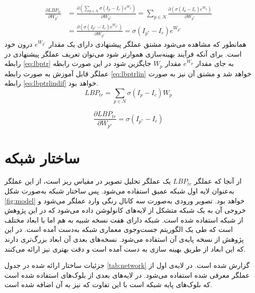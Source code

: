 \begin{align}\label{eq:lbptrdif}
	\frac{\partial LBP_{tr}}{\partial W_{p^*}} 
	&= \frac{\partial (\sum_{p\in N}\sigma(I_p-I_c)e^{W_p}) }{\partial W_{p^*}} 
	= \sum_{p\in N} {\frac{\partial (\sigma(I_p-I_c)e^{W_p}) }{\partial W_{p^*}} }
	\\&= 	\frac{\partial (\sigma(I_{p^*}-I_c)e^{W_{p^*}})}{\partial W_{p^*}}
	= \sigma(I_{p^*}-I_c)e^{W_{p^*}}
	\nonumber
\end{align}
همانطور که مشاهده می‌شود مشتق عملگر پیشنهادی دارای یک مقدار 
$e^{W_{p^*}}$
درون خود است. برای آنکه فرآیند بهینه‌سازی هموارتر شود می‌توان تعریف عملگر پیشنهادی در رابطه 
\ref{eq:lbptr}
به جای مقدار 
$e^{W_p}$
مقدار 
$W_p$
جایگزین شود در این صورت رابطه عملگر قابل آموزش به صورت رابطه 
\ref{eq:lbptrlin}
خواهد شد و مشتق آن نیز به صورت رابطه 
\ref{eq:lbptrlindif}
خواهد بود.
\begin{equation}\label{eq:lbptrlin}
	LBP_{tr}=\sum_{p\in N}\sigma(I_p-I_c)W_p 
\end{equation}

\begin{equation}\label{eq:lbptrlindif}
	\frac{\partial LBP_{tr}}{\partial W_{p^*}}=
	\sigma(I_{p^*}-I_c)
\end{equation}


 \section{ساختار شبکه}

 از آنجا که عملگر  
$LBP_{tr}$
 یک عملگر تحلیل تصویر در مقیاس ریز است، از این عملگر به‌عنوان لایه اول شبکه عمیق استفاده می‌شود. پس ساختار شبکه به‌صورت شکل 
\ref{fig:model}
 خواهد بود.
 تصویر ورودی به‌صورت سه کانال رنگی وارد عملگر   می‌شود و خروجی آن به یک شبکه متشکل از لایه‌های کانولوشن داده می‌شود که در این پژوهش از شبکه
   \cite{tan2019efficientnet}
 استفاده شده است. شبکه 
 دارای هفت نسخه شبیه به هم اما با ابعاد مختلف است که طی یک الگوریتم جست‌و‌جوی معماری شبکه به‌دست آمده است. در این پژوهش از نسخه پایه‌ی آن استفاده می‌شود. نسخه‌های بعدی آن ابعاد بزرگ‌تری دارند که این ابعاد از طریق بهینه سازی به دست آمده است و دقت بهتری نیز ارائه می‌کنند.
 
 جزئیات ساختار ارائه شده در جدول 
 \ref{tab:network}
 گزارش شده است. در لایه‌ی اول از عملگر معرفی شده استفاده می‌شود. در لایه‌های بعدی از بلوک‌های
 استفاده شده است که بلوک‌های پایه شبکه 
  \cite{sandler2018mobilenetv2}
 است با این تفاوت که 
  \cite{hu2018squeeze}
 نیز به آن اضافه شده است.

